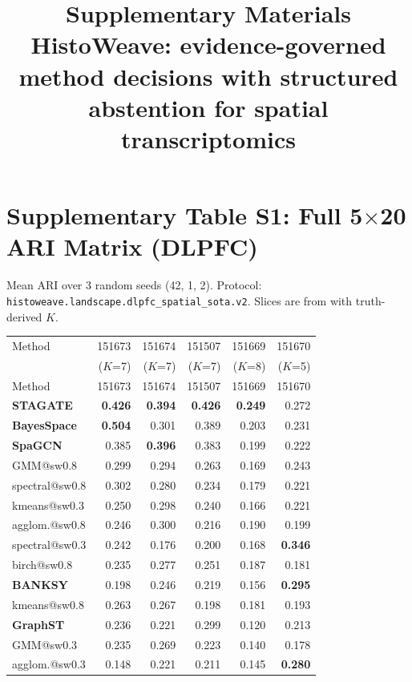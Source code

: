 \documentclass[11pt]{article}
\title{Supplementary Materials\\
\large HistoWeave: evidence-governed method decisions with structured
abstention for spatial transcriptomics}
\author{}
\date{}
\begin{document}
\maketitle

\section*{Supplementary Table S1: Full 5$\times$20 ARI Matrix (DLPFC)}

Mean ARI over 3 random seeds (42, 1, 2). Protocol:
\texttt{histoweave.landscape.dlpfc\_spatial\_sota.v2}.
Slices are from \citet{maynard2021} with truth-derived $K$.

\begin{small}
\begin{longtable}{@{}lrrrrr@{}}
\toprule
Method & 151673 & 151674 & 151507 & 151669 & 151670 \\
 & ($K$=7) & ($K$=7) & ($K$=7) & ($K$=8) & ($K$=5) \\
\midrule
\endfirsthead
\toprule
Method & 151673 & 151674 & 151507 & 151669 & 151670 \\
\midrule
\endhead
\textbf{STAGATE} & \textbf{0.426} & \textbf{0.394} & \textbf{0.426} & \textbf{0.249} & 0.272 \\
\textbf{BayesSpace} & \textbf{0.504} & 0.301 & 0.389 & 0.203 & 0.231 \\
\textbf{SpaGCN} & 0.385 & \textbf{0.396} & 0.383 & 0.199 & 0.222 \\
GMM@sw0.8 & 0.299 & 0.294 & 0.263 & 0.169 & 0.243 \\
spectral@sw0.8 & 0.302 & 0.280 & 0.234 & 0.179 & 0.221 \\
kmeans@sw0.3 & 0.250 & 0.298 & 0.240 & 0.166 & 0.221 \\
agglom.@sw0.8 & 0.246 & 0.300 & 0.216 & 0.190 & 0.199 \\
spectral@sw0.3 & 0.242 & 0.176 & 0.200 & 0.168 & \textbf{0.346} \\
birch@sw0.8 & 0.235 & 0.277 & 0.251 & 0.187 & 0.181 \\
\textbf{BANKSY} & 0.198 & 0.246 & 0.219 & 0.156 & \textbf{0.295} \\
kmeans@sw0.8 & 0.263 & 0.267 & 0.198 & 0.181 & 0.193 \\
\textbf{GraphST} & 0.236 & 0.221 & 0.299 & 0.120 & 0.213 \\
GMM@sw0.3 & 0.235 & 0.269 & 0.223 & 0.140 & 0.178 \\
agglom.@sw0.3 & 0.148 & 0.221 & 0.211 & 0.145 & \textbf{0.280} \\

\end{longtable}
\end{small}
\end{document}
